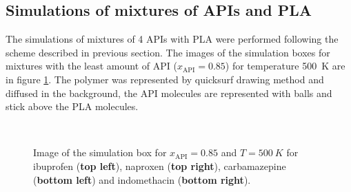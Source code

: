 \subsection{Simulations of mixtures of APIs and PLA}
The simulations of mixtures of 4 APIs with PLA were performed following the scheme described in previous section. The images of the simulation boxes for mixtures with the least amount of API ($x_{\text{API}}=0.85$) for temperature 500~K are in figure \ref{fig:mix_boxes}. The polymer was represented by quicksurf drawing method and diffused in the background, the API molecules are represented with balls and stick above the PLA molecules.

\begin{figure}[htb!]
	\centering
	\hspace{0.2cm}
	\\
	\vspace{0.2cm}
	\hspace{0.2cm}
	\caption{Image of the simulation box for $x_{\text{API}}=0.85$ and $T=500~K$ for ibuprofen (\textbf{top left}), naproxen (\textbf{top right}), carbamazepine (\textbf{bottom left}) and indomethacin (\textbf{bottom right}).}
	\label{fig:mix_boxes}
\end{figure}

